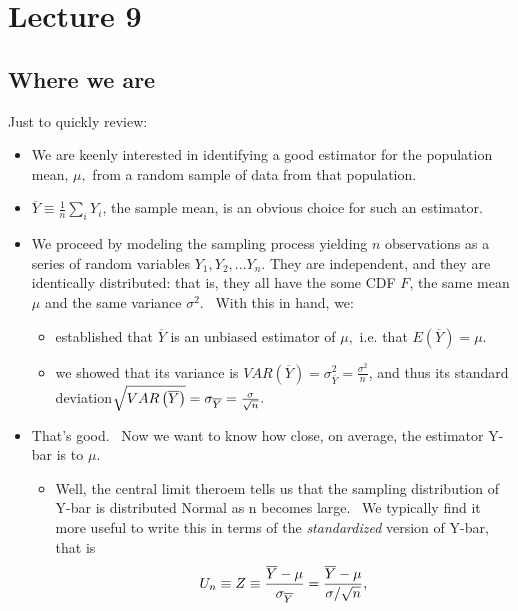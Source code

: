 \documentclass[11pt]{article}
\begin{document}
\section{Lecture 9}

\subsection{Where we are}

Just to quickly review:

\begin{itemize}
\item We are keenly interested in identifying a good estimator for the
population mean, $\mu ,$ from a random sample of data from that population.

\item $\overline{Y}\equiv \frac{1}{n}\sum\nolimits_{i}Y_{i}$, the sample
mean, is an obvious choice for such an estimator.

\item We proceed by modeling the sampling process yielding $n$ observations
as a series of random variables $Y_{1},Y_{2},...Y_{n}.$ They are
independent, and they are identically distributed: that is, they all have
the some CDF $F$, the same mean $\mu $ and the same variance $\sigma ^{2}$.
\ With this in hand, we:

\begin{itemize}
\item established that $\overline{Y}$ is an unbiased estimator of $\mu ,$
i.e. that $E\left( \overline{Y}\right) =\mu .$

\item we showed that its variance is $VAR\left( \overline{Y}\right) =\sigma
_{\overline{Y}}^{2}=\frac{\sigma ^{2}}{n}$, and thus its standard deviation$%
\sqrt{VAR\left( \overline{Y}\right) }=\sigma _{\overline{Y}}=\frac{\sigma }{%
\sqrt{n}}.$
\end{itemize}

\item That's good. \ Now we want to know how close, on average, the
estimator Y-bar is to $\mu .$

\begin{itemize}
\item Well, the central limit theroem tells us that the sampling
distribution of Y-bar is distributed Normal as n becomes large. \ We
typically find it more useful to write this in terms of the \textit{%
standardized }version of Y-bar, that is%
\begin{equation*}
U_{n}\equiv Z\equiv \frac{\overline{Y}-\mu }{\sigma _{\overline{Y}}}=\frac{%
\overline{Y}-\mu }{\sigma /\sqrt{n}},
\end{equation*}


\end{itemize}
\end{itemize}
\end{document}
